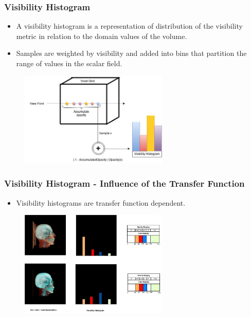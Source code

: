 \documentclass{beamer}
\begin{document}
\begin{frame}
\frametitle{Visibility Histogram}
\begin{itemize}
\item A visibility histogram is a representation of distribution of the visibility metric in relation to the domain values of the volume.
\item Samples are weighted by visibility and added into bins that partition the range of values in the scalar field.
\end{itemize}
\begin{figure}
\centering
\includegraphics[width=200pt]{VHistogram.jpg}
\end{figure}
\end{frame}


\begin{frame}
\frametitle{Visibility Histogram - Influence of the Transfer Function }
\begin{itemize}
\item Visibility histograms are transfer function dependent.
\end{itemize}
\begin{figure}
\centering
\includegraphics[width=200pt]{tf_influence.jpg}
\end{figure}
\end{frame}

\end{document}
